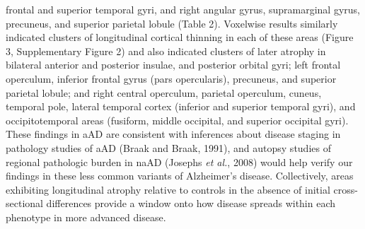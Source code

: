 \documentclass[]{article}
\begin{document}
frontal and superior temporal gyri, and right angular gyrus,
supramarginal gyrus, precuneus, and superior parietal lobule (Table 2).
Voxelwise results similarly indicated clusters of longitudinal cortical
thinning in each of these areas (Figure 3, Supplementary Figure 2) and
also indicated clusters of later atrophy in bilateral anterior and
posterior insulae, and posterior orbital gyri; left frontal operculum,
inferior frontal gyrus (pars opercularis), precuneus, and superior
parietal lobule; and right central operculum, parietal operculum,
cuneus, temporal pole, lateral temporal cortex (inferior and superior
temporal gyri), and occipitotemporal areas (fusiform, middle occipital,
and superior occipital gyri). These findings in aAD are consistent with
inferences about disease staging in pathology studies of aAD (Braak and
Braak, 1991), and autopsy studies of regional pathologic burden in naAD
(Josephs \emph{et al.}, 2008) would help verify our findings in these
less common variants of Alzheimer's disease. Collectively, areas
exhibiting longitudinal atrophy relative to controls in the absence of
initial cross-sectional differences provide a window onto how disease
spreads within each phenotype in more advanced disease.
\end{document}
